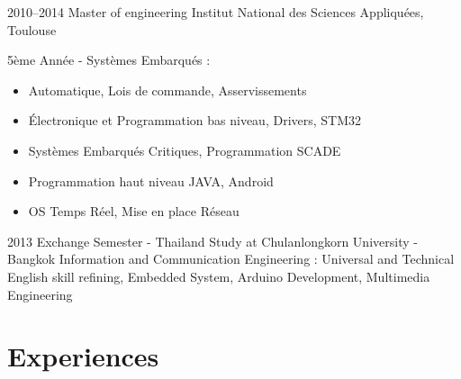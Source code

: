 \documentclass[a4paper]{friggeri-cv} %
\begin{document}
\begin{entrylist}

\entry
{2010--2014}
{Master of engineering}
{Institut National des Sciences Appliquées, Toulouse}
{5ème Année - Systèmes Embarqués : 

\begin{itemize}
\item Automatique, Lois de commande, Asservissements
\item Électronique et Programmation bas niveau, Drivers, STM32
\item Systèmes Embarqués Critiques, Programmation SCADE
\item Programmation haut niveau JAVA, Android
\item OS Temps Réel, Mise en place Réseau
\end{itemize}}


\entry
{2013}
{Exchange Semester - Thailand}
{Study at Chulanlongkorn University - Bangkok}
{Information and Communication Engineering : 
Universal and Technical English skill refining, Embedded System, Arduino Development, Multimedia Engineering}





\end{entrylist}





\section{Experiences}
\end{document}
